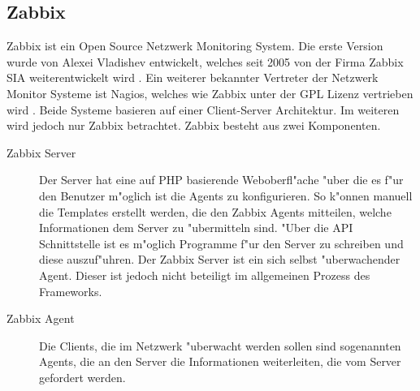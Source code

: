 \subsection{Zabbix}
Zabbix ist ein Open Source Netzwerk Monitoring System. Die erste Version wurde von Alexei Vladishev entwickelt, welches %
seit 2005 von der Firma Zabbix SIA weiterentwickelt wird \autocite{zabbix:Web}. %
Ein weiterer bekannter Vertreter der Netzwerk Monitor Systeme ist Nagios, welches wie Zabbix unter der GPL Lizenz vertrieben wird \autocite{wiki:Nagios}. %
Beide Systeme basieren auf einer Client-Server Architektur. Im weiteren wird jedoch nur Zabbix betrachtet. %
Zabbix besteht aus zwei Komponenten. %
\begin{description}
\item[Zabbix Server]Der Server hat eine auf PHP basierende Weboberfl"ache "uber die es f"ur den Benutzer m"oglich ist die Agents zu %
konfigurieren. So k"onnen manuell die Templates erstellt werden, die den Zabbix Agents mitteilen, welche Informationen dem %
Server zu "ubermitteln sind. %
"Uber die API Schnittstelle ist es m"oglich Programme f"ur den Server zu schreiben und diese auszuf"uhren. %
Der Zabbix Server ist ein sich selbst "uberwachender Agent. Dieser ist jedoch nicht beteiligt %
im allgemeinen Prozess des Frameworks.
\item[Zabbix Agent]Die Clients, die im Netzwerk "uberwacht werden sollen sind sogenannten Agents, die an den Server %
die Informationen weiterleiten, die vom Server gefordert werden. %
\end{description} 

